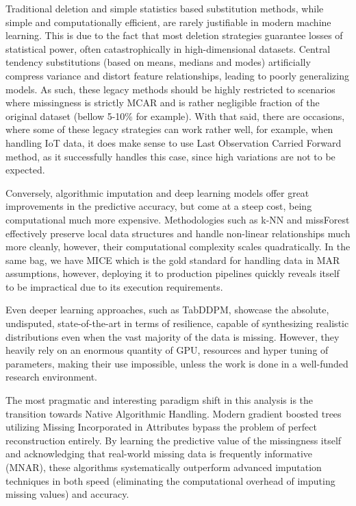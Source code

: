 \documentclass[journal]{IEEEtran}
\begin{document}
Traditional deletion and simple statistics based substitution methods, while simple and computationally efficient, are rarely justifiable in modern machine learning. This is due to the fact that most deletion strategies guarantee losses of statistical power, often catastrophically in high-dimensional datasets. Central tendency substitutions (based on means, medians and modes) artificially compress variance and distort feature relationships, leading to poorly generalizing models. As such, these legacy methods should be highly restricted to scenarios where missingness is strictly MCAR and is rather negligible fraction of the original dataset (bellow 5-10\% for example). With that said, there are occasions, where some of these legacy strategies can work rather well, for example, when handling IoT data, it does make sense to use Last Observation Carried Forward method, as it successfully handles this case, since high variations are not to be expected.

Conversely, algorithmic imputation and deep learning models offer great improvements in the predictive accuracy, but come at a steep cost, being computational much more expensive. Methodologies such as k-NN and missForest effectively preserve local data structures and handle non-linear relationships much more cleanly, however, their computational complexity scales quadratically. In the same bag, we have MICE which is the gold standard for handling data in MAR assumptions, however, deploying it to production pipelines quickly reveals itself to be impractical due to its execution requirements.

Even deeper learning approaches, such as TabDDPM, showcase the absolute, undisputed, state-of-the-art in terms of resilience, capable of synthesizing realistic distributions even when the vast majority of the data is missing. However, they heavily rely on an enormous quantity of GPU, resources and hyper tuning of parameters, making their use impossible, unless the work is done in a well-funded research environment.

The most pragmatic and interesting paradigm shift in this analysis is the transition towards Native Algorithmic Handling. Modern gradient boosted trees utilizing Missing Incorporated in Attributes bypass the problem of perfect reconstruction entirely. By learning the predictive value of the missingness itself and acknowledging that real-world missing data is frequently informative (MNAR), these algorithms systematically outperform advanced imputation techniques in both speed (eliminating the computational overhead of imputing missing values) and accuracy.
\end{document}
